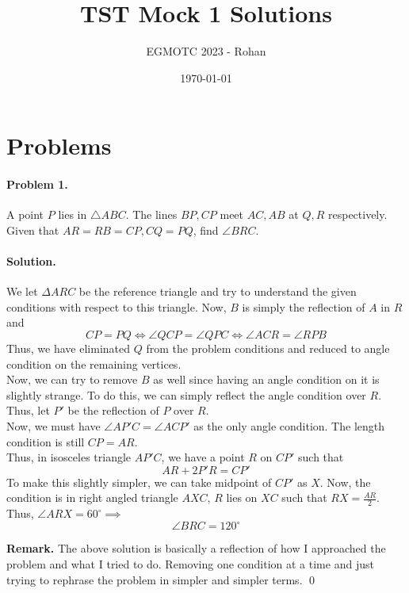 \documentclass[12pt]{article}
\title{TST Mock 1 Solutions}
\author{EGMOTC 2023 - Rohan}
\date{\today}
\newenvironment{solution}
{\paragraph{Solution.}}
{\qed\eject}
\begin{document}
\maketitle

\newcommand{\localtextbulletone}{\textcolor{black}{\raisebox{.45ex}{\rule{.6ex}{.6ex}}}}
\renewcommand{\labelitemi}{\localtextbulletone}

\section*{Problems}
\vspace{1cm}
\thispagestyle{empty}

\paragraph{\textbf{Problem 1.}} A point $P$ lies in $\triangle ABC$. The lines $BP,CP$ meet $AC,AB$ at $Q,R$ respectively. Given that $AR=RB=CP, CQ=PQ$, find $\angle BRC$. %

\begin{solution}
    We let $\Delta ARC$ be the reference triangle and try to understand the given conditions with respect to this triangle. Now, $B$ is simply the reflection of $A$ in $R$ and \[CP=PQ\iff \angle QCP=\angle QPC\iff \angle ACR=\angle RPB\]
    Thus, we have eliminated $Q$ from the problem conditions and reduced to angle condition on the remaining vertices.\\
    
    Now, we can try to remove $B$ as well since having an angle condition on it is slightly strange. To do this, we can simply reflect the angle condition over $R$. Thus, let $P'$ be the reflection of $P$ over $R$.\\

    Now, we must have $\angle AP'C=\angle ACP'$ as the only angle condition. The length condition is still $CP=AR$.\\

    Thus, in isosceles triangle $AP'C$, we have a point $R$ on $CP'$ such that \[AR+2P'R=CP'\] To make this slightly simpler, we can take midpoint of $CP'$ as $X$. Now, the condition is in right angled triangle $AXC$, $R$ lies on $XC$ such that $RX=\frac{AR}{2}$. Thus, $\boxed{\angle ARX=60^{\circ}}\implies $ 
    \[\angle BRC = 120^{\circ}\]

    \textbf{Remark.} The above solution is basically a reflection of how I approached the problem and what I tried to do. Removing one condition at a time and just trying to rephrase the problem in simpler and simpler terms.
\end{solution}
\end{document}
